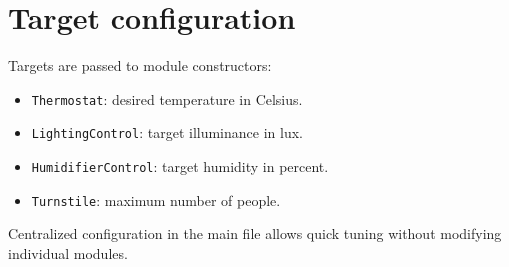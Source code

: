 \section{Target configuration}
Targets are passed to module constructors:
\begin{itemize}
  \item \texttt{Thermostat}: desired temperature in Celsius.
  \item \texttt{LightingControl}: target illuminance in lux.
  \item \texttt{HumidifierControl}: target humidity in percent.
  \item \texttt{Turnstile}: maximum number of people.
\end{itemize}
Centralized configuration in the main file allows quick tuning without modifying individual modules.

